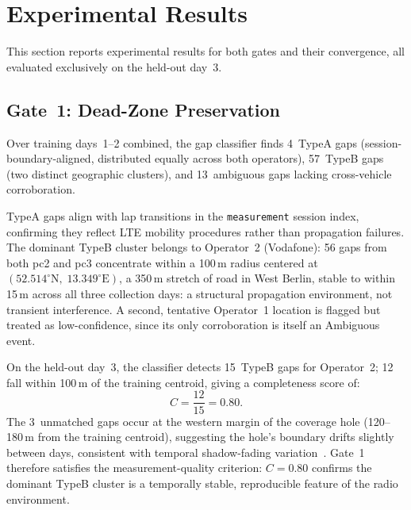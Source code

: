 \documentclass[conference]{IEEEtran}
\begin{document}
\section{Experimental Results}
\label{sec:results}

This section reports experimental results for both gates and their
convergence, all evaluated exclusively on the held-out day~3.

\subsection{Gate~1: Dead-Zone Preservation}
\label{sec:gate1results}

Over training days~1--2 combined, the gap classifier finds 4~TypeA gaps
(session-boundary-aligned, distributed equally across both operators),
57~TypeB gaps (two distinct geographic clusters), and 13~ambiguous gaps
lacking cross-vehicle corroboration.

TypeA gaps align with lap transitions in the \texttt{measurement}
session index, confirming they reflect LTE mobility procedures rather
than propagation failures. The dominant TypeB cluster belongs to
Operator~2 (Vodafone): 56 gaps from both pc2 and pc3 concentrate within
a 100\,m radius centered at
$(52.514^\circ\text{N},\;13.349^\circ\text{E})$, a 350\,m stretch of
road in West Berlin, stable to within 15\,m across all three collection
days: a structural propagation environment, not transient
interference. A second, tentative Operator~1 location is flagged but
treated as low-confidence, since its only corroboration is itself an
Ambiguous event.

On the held-out day~3, the classifier detects 15~TypeB gaps for
Operator~2; 12 fall within 100\,m of the training centroid, giving a
completeness score of:
\begin{equation}
  C = \frac{12}{15} = 0.80.
  \label{eq:c_result}
\end{equation}
The 3~unmatched gaps occur at the western margin of the coverage hole
(120--180\,m from the training centroid), suggesting the hole's
boundary drifts slightly between days, consistent with temporal
shadow-fading variation~\cite{del2017survey}. Gate~1 therefore
satisfies the measurement-quality criterion: $C=0.80$ confirms the
dominant TypeB cluster is a temporally stable, reproducible feature of
the radio environment.
\end{document}

